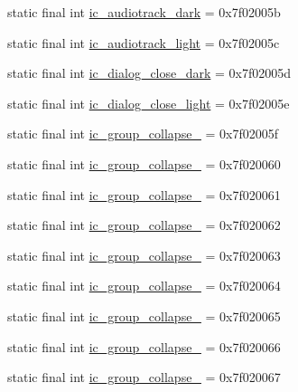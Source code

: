 \begin{CompactItemize}
\item 
static final int \hyperlink{classandroid_1_1support_1_1v4_1_1_r_1_1drawable_87a0babdcb97b758bc8d9b0edb8fdd4e}{ic\_\-audiotrack\_\-dark} = 0x7f02005b
\item 
static final int \hyperlink{classandroid_1_1support_1_1v4_1_1_r_1_1drawable_75b449ca63b6df6ca7f0b86245a125b3}{ic\_\-audiotrack\_\-light} = 0x7f02005c
\item 
static final int \hyperlink{classandroid_1_1support_1_1v4_1_1_r_1_1drawable_81d1213d598a5eb9aebcddb2cea69454}{ic\_\-dialog\_\-close\_\-dark} = 0x7f02005d
\item 
static final int \hyperlink{classandroid_1_1support_1_1v4_1_1_r_1_1drawable_35da1e6da39dfeb1d75bd2271a31648c}{ic\_\-dialog\_\-close\_\-light} = 0x7f02005e
\item 
static final int \hyperlink{classandroid_1_1support_1_1v4_1_1_r_1_1drawable_fddcc83ded4f697e0197fa47d5b1e673}{ic\_\-group\_\-collapse\_} = 0x7f02005f
\item 
static final int \hyperlink{classandroid_1_1support_1_1v4_1_1_r_1_1drawable_085a62e51c2742e87afc7c000dcb064f}{ic\_\-group\_\-collapse\_} = 0x7f020060
\item 
static final int \hyperlink{classandroid_1_1support_1_1v4_1_1_r_1_1drawable_3e4a478c4e5269deda6e80253c80e0a9}{ic\_\-group\_\-collapse\_} = 0x7f020061
\item 
static final int \hyperlink{classandroid_1_1support_1_1v4_1_1_r_1_1drawable_bd631c9a9d42fee799c18f02a1e5221c}{ic\_\-group\_\-collapse\_} = 0x7f020062
\item 
static final int \hyperlink{classandroid_1_1support_1_1v4_1_1_r_1_1drawable_87c8213ccb46d0ed150d8cea5a464a0a}{ic\_\-group\_\-collapse\_} = 0x7f020063
\item 
static final int \hyperlink{classandroid_1_1support_1_1v4_1_1_r_1_1drawable_5c92a9056b2aa7d0bea6a6752e86882f}{ic\_\-group\_\-collapse\_} = 0x7f020064
\item 
static final int \hyperlink{classandroid_1_1support_1_1v4_1_1_r_1_1drawable_28649a34223de17ef02e157883af15c0}{ic\_\-group\_\-collapse\_} = 0x7f020065
\item 
static final int \hyperlink{classandroid_1_1support_1_1v4_1_1_r_1_1drawable_591580d546dc50dc6c0d0425bc59171d}{ic\_\-group\_\-collapse\_} = 0x7f020066
\item 
static final int \hyperlink{classandroid_1_1support_1_1v4_1_1_r_1_1drawable_8a02b92741be9f6f8666c0cd8fd93d34}{ic\_\-group\_\-collapse\_} = 0x7f020067

\end{CompactItemize}
